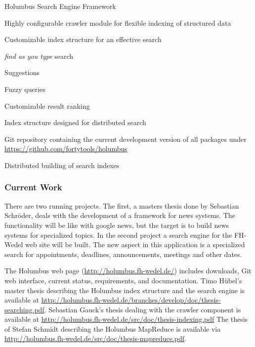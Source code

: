 \begin{hcarentry}[updated]{Holumbus Search Engine Framework}
\begin{compactitem}
\item Highly configurable crawler module for flexible indexing of structured data
\item Customizable index structure for an effective search
\item {\em find as you type} search
\item Suggestions
\item Fuzzy queries
\item Customizable result ranking
\item Index structure designed for distributed search
\item Git repository containing the current development version of all packages under
  \url{https://github.com/fortytools/holumbus}
\item Distributed building of search indexes
\end{compactitem}

\subsubsection*{Current Work}

There are two running projects. The first, a masters thesis done by Sebastian Schr\"oder,
deals with the development of a framework for news systems. The functionality
will be like with google news, but the target is to build news systems for specialized topics.
In the second project a search engine for the FH-Wedel web site will be built. The new aspect in
this application is a specialized search for appointments, deadlines, announcements, meetings and other dates.

\FurtherReading

The Holumbus web page
(\url{http://holumbus.fh-wedel.de/})
includes downloads, Git web interface, current status, requirements, 
and documentation.
Timo H\"ubel's master thesis describing the Holumbus index structure and
the search engine is available at
\url{http://holumbus.fh-wedel.de/branches/develop/doc/thesis-searching.pdf}.
Sebastian Gauck's  thesis dealing with the crawler component is
available at
\url{http://holumbus.fh-wedel.de/src/doc/thesis-indexing.pdf}
The thesis of Stefan Schmidt describing the Holumbus MapReduce is
available via \url{http://holumbus.fh-wedel.de/src/doc/thesis-mapreduce.pdf}.
\end{hcarentry}
